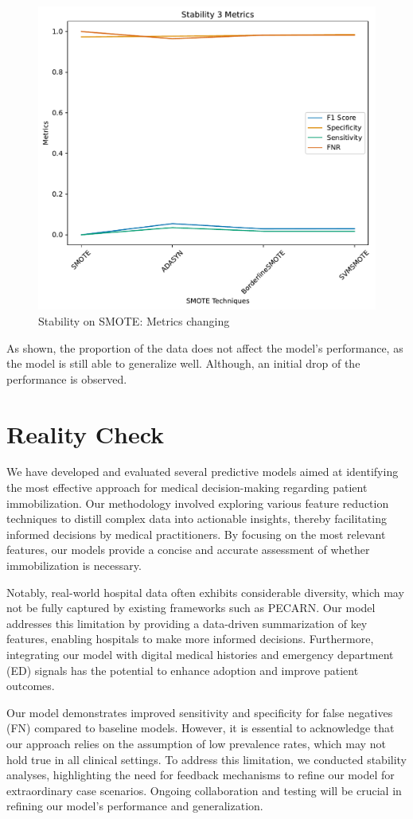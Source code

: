\documentclass[10pt,letterpaper]{article}
\begin{document}
\begin{figure}[H]
    \centering
    \includegraphics[width=0.5\linewidth]{../plots/tabpfn_stability3_metrics.pdf}
    \caption{Stability on SMOTE: Metrics changing}
    \label{fig:enter-label}
\end{figure}

As shown, the proportion of the data does not affect the model's performance, as the model is still able to generalize well. Although,
an initial drop of the performance is observed. 

\section{Reality Check}

We have developed and evaluated several predictive models aimed at identifying the most effective approach for medical decision-making regarding patient immobilization. Our methodology involved exploring various feature reduction techniques to distill complex data into actionable insights, thereby facilitating informed decisions by medical practitioners. By focusing on the most relevant features, our models provide a concise and accurate assessment of whether immobilization is necessary.

Notably, real-world hospital data often exhibits considerable diversity, which may not be fully captured by 
existing frameworks such as PECARN. Our model addresses this limitation by providing a data-driven summarization
 of key features, enabling hospitals to make more informed decisions. Furthermore, integrating our model with digital
  medical histories and emergency department (ED) signals has the potential to enhance adoption and improve patient outcomes.

Our model demonstrates improved sensitivity and specificity for false negatives (FN) compared to baseline models. 
However, it is essential to acknowledge that our approach relies on the assumption of low prevalence rates, 
which may not hold true in all clinical settings. To address this limitation, we conducted stability analyses, 
highlighting the need for feedback mechanisms to refine our model for extraordinary case scenarios. Ongoing 
collaboration and testing will be crucial in refining our model's performance and generalization.
\end{document}
